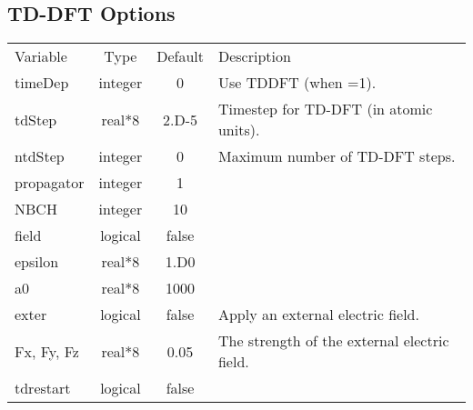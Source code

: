 \documentclass[journal=jctcce,manuscript=article]{achemso}
\begin{document}
    \subsection{TD-DFT Options}
    \begin{table}  [H]
      \begin{center}
      \begin{tabular}{ l c c l}
         Variable & Type & Default & Description \\
         timeDep & integer & 0 & Use TDDFT (when =1). \\
         tdStep & real*8 & 2.D-5 & Timestep for TD-DFT (in atomic units). \\
         ntdStep & integer & 0 & Maximum number of TD-DFT steps. \\
         propagator & integer & 1 & \\
         NBCH & integer & 10 & \\
         field & logical & false & \\
         epsilon & real*8 & 1.D0 & \\
         a0 & real*8 & 1000 & \\
         exter & logical & false & Apply an external electric field. \\
         Fx, Fy, Fz & real*8 & 0.05 &  The strength of the external electric field. \\
         tdrestart & logical & false & \\
       \end{tabular}
       \end{center}
      \label{lio.tddft.var}
    \end{table}    
\end{document}
